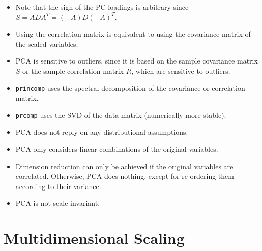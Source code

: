 \documentclass[a4paper]{article}
\begin{document}
\begin{itemize}
    \item Note that the sign of the PC loadings is arbitrary since $S=ADA^T=(-A)D(-A)^T$.
    \item Using the correlation matrix is equivalent to using the covariance matrix of the scaled variables.
    \item PCA is sensitive to outliers, since it is based on the sample covariance matrix $S$ or the sample correlation matrix $R$, which are sensitive to outliers.
    \item \texttt{princomp} uses the spectral decomposition of the covariance or correlation matrix.
    \item \texttt{prcomp} uses the SVD of the data matrix (numerically more stable).
    \item PCA does not reply on any distributional assumptions.
    \item PCA only considers linear combinations of the original variables.
    \item Dimension reduction can only be achieved if the original variables are correlated. Otherwise, PCA does nothing, except for re-ordering them according to their variance.
    \item PCA is not scale invariant.
\end{itemize}

\section{Multidimensional Scaling}
\end{document}
